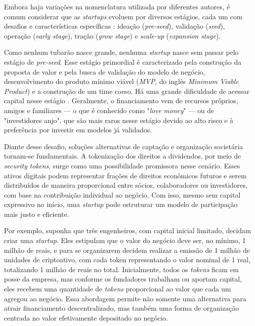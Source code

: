 \documentclass[12pt, a4paper, oneside, openright, chapter=TITLE]{abntex2}
\begin{document}
Embora haja variações na nomenclatura utilizada por diferentes autores, é comum considerar que as \textit{startups} evoluem por diversos estágios, cada um com desafios e características específicas \cite{sebrae2023}: ideação (\textit{pre-seed}), validação (\textit{seed}), operação (\textit{early stage}), tração (\textit{grow stage}) e \textit{scale-up} (\textit{expansion stage}).

Como nenhum tubarão nasce grande, nenhuma \textit{startup} nasce sem passar pelo estágio de   \textit{pre-seed}. Esse estágio primordial é caracterizado pela construção da proposta de valor e pela busca de validação do modelo de negócio, desenvolvimento do produto mínimo viável (\textit{MVP}, do inglês \textit{Minimum Viable Product}) e a construção de um time coeso. Há uma grande dificuldade de acessar capital nesse estágio \cite{maringa2024}. Geralmente, o financiamento vem de recursos próprios, amigos e familiares — o que é conhecido como "\textit{love money}" — ou de "investidores anjo", que são mais raros nesse estágio devido ao alto risco e à preferência por investir em modelos já validados.

Diante desse desafio, soluções alternativas de captação e organização societária tornam-se fundamentais. A tokenização dos direitos a dividendos, por meio de \textit{security tokens}, surge como uma possibilidade promissora nesse cenário. Esses ativos digitais podem representar frações de direitos econômicos futuros e serem distribuídos de maneira proporcional entre sócios, colaboradores ou investidores, com base na contribuição individual ao negócio. Com isso, mesmo sem capital expressivo no início, uma \textit{startup} pode estruturar um modelo de participação mais justo e eficiente.

Por exemplo, suponha que três engenheiros, com capital inicial limitado, decidam criar uma \textit{startup}. Eles estipulam que o valor do negócio deve ser, no mínimo, 1 milhão de reais, e para se organizarem decidem realizar a emissão de 1 milhão de unidades de criptoativo, com cada token representando o valor nominal de 1 real, totalizando 1 milhão de reais no total. Inicialmente, todos os \textit{tokens} ficam em posse da empresa, mas conforme os fundadores trabalham ou aportam capital, eles recebem uma quantidade de \textit{tokens} proporcional ao valor que cada um agregou ao negócio. Essa abordagem permite não somente uma alternativa para atrair financiamento descentralizado, mas também uma forma de organização centrada no valor efetivamente depositado no negócio.
\end{document}
